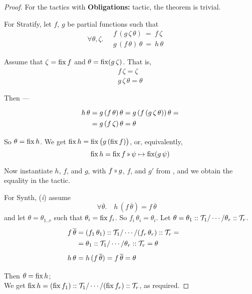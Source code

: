 \begin{proof}
For the tactics with {\bf Obligations:} tactic, the theorem is trivial.

\medskip
For Stratify, let $f$, $g$ be partial functions such that
\[\renewcommand\arraystretch{1.3}
  \forall \theta,\zeta.\quad \begin{array}{l}f\,(g\,\zeta\,\theta) ~=~ f\,\zeta \\
  g\,(f\,\theta)\,\theta ~=~ h\,\theta
  \end{array}\quad\]
  
Assume that $\zeta = \operatorname{fix} f$ and $\theta = \operatorname{fix} (g\,\zeta)$. That is,
\[\renewcommand\arraystretch{1.3}
  \begin{array}{l}
    f\,\zeta = \zeta\\
    g\,\zeta\,\theta = \theta
  \end{array}\]
  
Then ---
\[\renewcommand\arraystretch{1.3}
  \begin{array}{l@{}l}
   h\,\theta & {}= g\,(f\,\theta)\,\theta = g\,(f\,(g\,\zeta\,\theta))\,\theta = \\
             & {}= g\,(f\,\zeta)\,\theta = \theta
  \end{array}\]
  
So $\theta = \operatorname{fix} h$. We get $\operatorname{fix} h = \operatorname{fix} \big(g \,(\operatorname{fix} f)\big)$, or, equivalently,
\[\fix h = \fix f \applt \psi\mapsto\fix (g\,\psi)\]

Now instantiate $h$, $f$, and $g$, with $f\applt g$, $f$, and $g'$ from ,
and we obtain the equality in the tactic.

\medskip
For Synth, ({\it i}) assume
\[\forall \overline\theta.\quad h\,(f\,\overline\theta)=f\,\overline\theta \quad\]
%
and let $\theta=\theta_{1..r}$ such that $\theta_i=\operatorname{fix} f_i$. So $f_i\,\theta_i=\theta_i$.
Let $\theta=\theta_1::\mathcal{T}_1/\cdots/\theta_r::\mathcal{T}_r$.
\[\renewcommand\arraystretch{1.3}
  \begin{array}{l@{}l}
   f\,\overline\theta & {}= (f_1\,\theta_1)::\T_1 / \cdots / (f_r\,\theta_r)::\T_r =  \\
     & {}= \theta_1::\T_1 / \cdots / \theta_r::\T_r = \theta \\[.5em]
   h\,\theta & {}= h\,(f\,\overline\theta) = f\,\overline\theta = \theta
   \end{array}\qquad\]
   
Then $\theta=\operatorname{fix} h$;\\
We get $\operatorname{fix} h = (\operatorname{fix} f_1)::\mathcal{T}_1 / \cdots / (\operatorname{fix} f_r)::\mathcal{T}_r$,
as required.


\end{proof}
